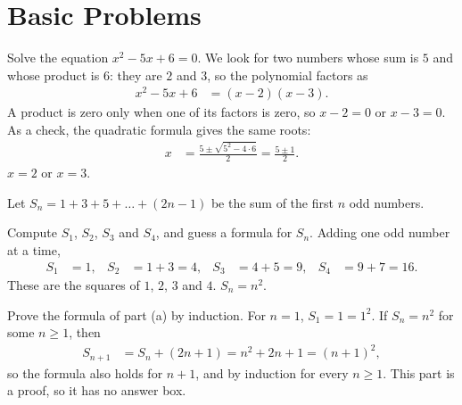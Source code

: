 \chapter{Basic Problems}


\begin{problem}
{
Solve the equation $x^2 - 5x + 6 = 0$.
}
{
We look for two numbers whose sum is $5$ and whose product is $6$: they are $2$
and $3$, so the polynomial factors as
\begin{align}
    x^2 - 5x + 6 &= (x - 2)(x - 3). \label{eq:quadratic-factored}
\end{align}
A product is zero only when one of its factors is zero, so $x - 2 = 0$ or
$x - 3 = 0$. As a check, the quadratic formula gives the same roots:
\begin{align*}
    x &= \frac{5 \pm \sqrt{5^2 - 4 \cdot 6}}{2} = \frac{5 \pm 1}{2}.
\end{align*}
}
{
$x = 2$ or $x = 3$.
}
\end{problem}


\begin{problem}
{
Let $S_n = 1 + 3 + 5 + \dots + (2n - 1)$ be the sum of the first $n$ odd
numbers.\label{prob:odd-sum}
}{}{}
\end{problem}

\begin{subproblem}
{
Compute $S_1$, $S_2$, $S_3$ and $S_4$, and guess a formula for $S_n$.
\label{prob:odd-sum-guess}
}
{
Adding one odd number at a time,
\begin{align*}
    S_1 &= 1, & S_2 &= 1 + 3 = 4, & S_3 &= 4 + 5 = 9, & S_4 &= 9 + 7 = 16.
\end{align*}
These are the squares of $1$, $2$, $3$ and $4$.
}
{
$S_n = n^2$.
}
\end{subproblem}

\begin{subproblem}
{
Prove the formula of part (a) by induction.
}
{
For $n = 1$, $S_1 = 1 = 1^2$. If $S_n = n^2$ for some $n \ge 1$, then
\begin{align}
    S_{n+1} &= S_n + (2n + 1) = n^2 + 2n + 1 = (n + 1)^2,
    \label{eq:odd-sum-induction}
\end{align}
so the formula also holds for $n + 1$, and by induction for every $n \ge 1$.
This part is a proof, so it has no answer box.
}
{}
\end{subproblem}

